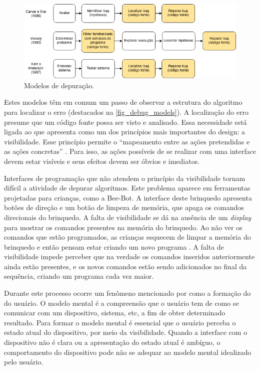 \begin{figure}[!htpb]
  \centering
  \includegraphics[width=.9\linewidth,fbox]{figs/debug_models.png}
  \caption{Modelos de depuração.}
  \sourceauthor
  \label{fig_debug_models}
\end{figure}

Estes modelos têm em comum um passo de observar a estrutura do algoritmo para localizar o erro (destacados na \autoref{fig_debug_models}). A localização do erro presume que um código fonte possa ser visto e analisado. Essa necessidade está ligada ao que  apresenta como um dos princípios mais importantes do design: a visibilidade. Esse princípio permite o “mapeamento entre as ações pretendidas e as ações concretas” \cite{norman_design_1988}. Para isso, as ações possíveis de se realizar com uma interface devem estar visíveis e seus efeitos devem ser óbvios e imediatos.

Interfaces de programação que não atendem o princípio da visibilidade tornam difícil a atividade de depurar algoritmos. Este problema aparece em ferramentas projetadas para crianças, como a Bee-Bot. A interface deste brinquedo apresenta botões de direção e um botão de limpeza de memória, que apaga os comandos direcionais do brinquedo. A falta de visibilidade se dá na ausência de um \textit{display} para mostrar os comandos presentes na memória do brinquedo. Ao não ver os comandos que estão programados, as crianças esquecem de limpar a memória do brinquedo e então pensam estar criando um novo programa \cite{raabe_brinquedos_2015}. A falta de visibilidade impede perceber que na verdade os comandos inseridos anteriormente ainda estão presentes, e os novos comandos estão sendo adicionados no final da sequência, criando um programa cada vez maior.

Durante este processo ocorre um fenômeno mencionado por  como a formação do  do usuário. O modelo mental é a compreensão que o usuário tem de como se comunicar com um dispositivo, sistema, etc, a fim de obter determinado resultado. Para formar o modelo mental é essencial que o usuário perceba o estado atual do dispositivo, por meio da visibilidade. Quando a interface com o dispositivo não é clara ou a apresentação do estado atual é ambíguo, o comportamento do dispositivo pode não se adequar ao modelo mental idealizado pelo usuário.

